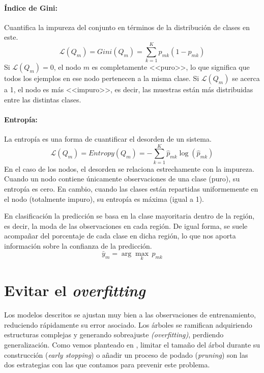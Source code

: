 \documentclass[titlepage, 11pt]{book}
\begin{document}
\paragraph*{Índice de Gini:}
Cuantifica la impureza del conjunto en términos de la distribución de clases en este.
\begin{equation*}
    \mathcal{L}(Q_m)=Gini(Q_m)=\sum^K_{k=1}p_{mk}(1-p_{mk})
\end{equation*}
Si $\mathcal{L}(Q_m) = 0$, el nodo $m$ es completamente <<puro>>, lo que significa que todos los ejemplos en ese nodo pertenecen a la misma clase. Si $\mathcal{L}(Q_m)$ se acerca a 1, el nodo es más <<impuro>>, es decir, las muestras están más distribuidas entre las distintas clases.


\paragraph*{Entropía:}
La entropía es una forma de cuantificar el desorden de un sistema.
\begin{equation*}
    \mathcal{L}(Q_m)=Entropy(Q_m)=-\sum^K_{k=1}\hat{p}_{mk}\log(\hat{p}_{mk})
\end{equation*}
En el caso de los nodos, el desorden se relaciona estrechamente con la impureza. Cuando un nodo contiene únicamente observaciones de una clase (puro), su entropía es cero. En cambio, cuando las clases están repartidas uniformemente en el nodo (totalmente impuro), su entropía es máxima (igual a 1).

En clasificación la predicción se basa en la clase mayoritaria dentro de la región, es decir, la moda de las observaciones en cada región. De igual forma, se suele acompañar del porcentaje de cada clase en dicha región, lo que nos aporta información sobre la confianza de la predicción.
\begin{equation*}
    \bar{y}_m=\arg\max_{k} \, p_{mk}
\end{equation*}


\section{Evitar el \textit{overfitting}} \label{sec:TreeOF}
Los modelos descritos se ajustan muy bien a las observaciones de entrenamiento, reduciendo rápidamente su error asociado. Los árboles se ramifican adquiriendo estructuras complejas y generando sobreajuste \textit{(overfitting)}, perdiendo generalización. Como vemos planteado en \cite{CART}, limitar el tamaño del árbol durante su construcción (\textit{early stopping}) o añadir un proceso de podado (\textit{pruning}) son las dos estrategias con las que contamos para prevenir este problema.
\end{document}
